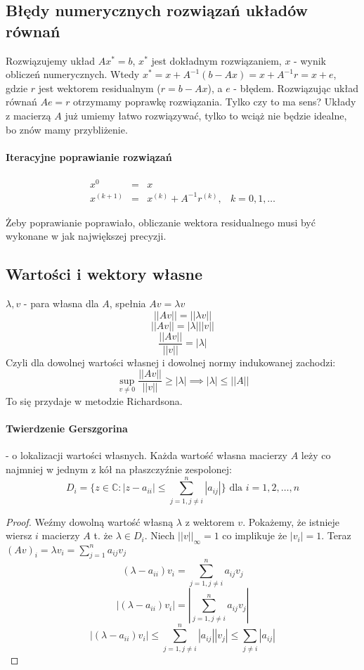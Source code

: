 \documentclass{article}
\begin{document}
\subsection{Błędy numerycznych rozwiązań układów równań}
Rozwiązujemy układ $ Ax^*=b $, $ x^* $ jest dokładnym rozwiązaniem, $ x $ - wynik obliczeń numerycznych. Wtedy $ x^*=x+A^{-1}(b-Ax)=x+A^{-1}r=x+e $, gdzie $ r $ jest wektorem residualnym ($ r=b-Ax $), a $ e $ - błędem. Rozwiązując układ równań $ Ae=r $ otrzymamy poprawkę rozwiązania. Tylko czy to ma sens? Układy z macierzą $ A $ już umiemy łatwo rozwiązywać, tylko to wciąż nie będzie idealne, bo znów mamy przybliżenie.
\paragraph{Iteracyjne poprawianie rozwiązań}
$$\begin{matrix}
 x^{0}&=&x \\
 x^{(k+1)}&=&x^{(k)}+A^{-1}r^{(k)}, &k=0,1,\ldots 
\end{matrix}$$


Żeby poprawianie poprawiało, obliczanie wektora residualnego musi być wykonane w jak największej precyzji.
\subsection{Wartości i wektory własne}
$ \lambda, v $ - para własna dla $A$, spełnia $ Av=\lambda v $
$$||Av||=||\lambda v||$$
$$||Av||=|\lambda|||v||$$
$$\frac{||Av||}{||v||}=|\lambda|$$
Czyli dla dowolnej wartości własnej i dowolnej normy indukowanej zachodzi:
$$\sup_{v\not=0}\frac{||Av||}{||v||}\ge|\lambda|\implies |\lambda|\le||A||$$
To się przydaje w metodzie Richardsona.

\paragraph{Twierdzenie Gerszgorina} - o lokalizacji wartości własnych. Każda wartość własna macierzy $ A $ leży co najmniej w jednym z kół na płaszczyźnie zespolonej:
$$ D_i=\{z\in\mathbb{C}:|z-a_{ii}|\le \sum_{j=1, j\not=i}^{n}|a_{ij}|\} \text{ dla }  i=1,2,\ldots, n $$
\begin{proof}
	Weźmy dowolną wartość własną $ \lambda $ z wektorem $ v $. Pokażemy, że istnieje wiersz $ i $ macierzy $ A $ t. że $ \lambda\in D_i $. Niech $ ||v||_\infty=1 $ co implikuje że $ |v_i|=1 $. Teraz $ (Av)_i=\lambda v_i=\sum_{j=1}^n a_{ij}v_j $\\
	
	$$(\lambda-a_{ii}) v_i=\sum_{j=1, j\not=i}^n a_{ij}v_j$$
	$$|(\lambda-a_{ii}) v_i|=|\sum_{j=1, j\not=i}^n a_{ij}v_j|$$
	$$|(\lambda-a_{ii}) v_i|\le\sum_{j=1, j\not=i}^n|a_{ij}||v_j|\le\sum_{j\not=i}|a_{ij}|$$
\end{proof}
\end{document}

